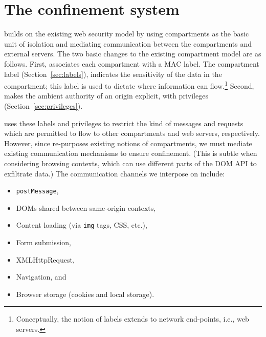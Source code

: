 \section{The \sys{} confinement system}
\label{sec:system}


\sys{} builds on the existing web security model by using compartments
as the basic unit of isolation and mediating communication between 
the compartments and external servers.
%
%
The two basic changes to the existing compartment model are as follows.
%
First, \sys{} associates each compartment with a MAC label.
%
The compartment label (Section~\ref{sec:labels}), indicates the
sensitivity of the data in the compartment; this label is used to
dictate where information can flow.\footnote{Conceptually, the notion
of labels extends to network end-points, i.e., web servers.}
%
%
%
Second, \sys{} makes the ambient authority of an origin explicit, with
privileges (Section~\ref{sec:privileges}).
 
\sys{} uses these labels and privileges to restrict the
kind of messages and requests which are permitted to flow to other
compartments and web servers, respectively.
%
However, since \sys{} re-purposes existing notions of compartments, we
must mediate existing communication mechanisms to ensure confinement.
%
(This is subtle when considering browsing contexts, which can use
different parts of the DOM API to exfiltrate data.)
%
The communication channels we interpose on include:
%
\begin{itemize}
    \item {\tt postMessage},
    \item DOMs shared between same-origin contexts,
    \item Content loading (via {\tt img} tags, CSS, etc.),
    \item Form submission,
    \item XMLHttpRequest,
    \item Navigation, and
    \item Browser storage (cookies and local storage).
\end{itemize}
%

